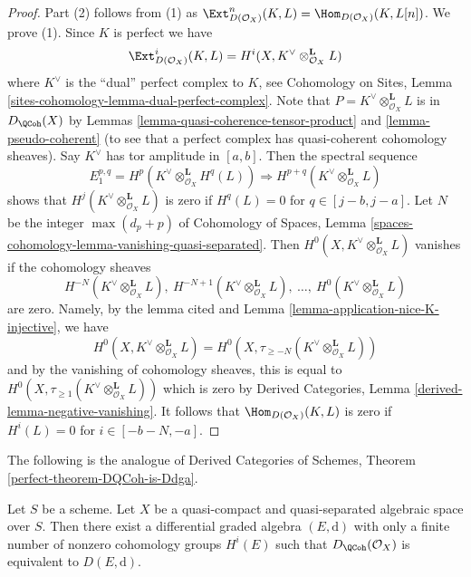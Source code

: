 \begin{proof}
Part (2) follows from (1) as $\Ext^n_{D(\mathcal{O}_X)}(K, L) =
\Hom_{D(\mathcal{O}_X)}(K, L[n])$. We prove (1).
Since $K$ is perfect we have
$$
\Ext^i_{D(\mathcal{O}_X)}(K, L) =
H^i(X, K^\vee \otimes_{\mathcal{O}_X}^\mathbf{L} L)
$$
where $K^\vee$ is the ``dual'' perfect complex to $K$, see
Cohomology on Sites, Lemma \ref{sites-cohomology-lemma-dual-perfect-complex}.
Note that $P = K^\vee \otimes_{\mathcal{O}_X}^\mathbf{L} L$
is in $D_\QCoh(X)$ by
Lemmas \ref{lemma-quasi-coherence-tensor-product} and
\ref{lemma-pseudo-coherent} (to see that a perfect complex
has quasi-coherent cohomology sheaves). Say $K^\vee$ has
tor amplitude in $[a, b]$. Then the spectral sequence
$$
E_1^{p, q} = H^p(K^\vee \otimes_{\mathcal{O}_X}^\mathbf{L} H^q(L))
\Rightarrow
H^{p + q}(K^\vee \otimes_{\mathcal{O}_X}^\mathbf{L} L)
$$
shows that $H^j(K^\vee \otimes_{\mathcal{O}_X}^\mathbf{L} L)$
is zero if $H^q(L) = 0$ for $q \in [j - b, j - a]$.
Let $N$ be the integer $\max(d_p + p)$ of
Cohomology of Spaces, Lemma
\ref{spaces-cohomology-lemma-vanishing-quasi-separated}.
Then $H^0(X, K^\vee \otimes_{\mathcal{O}_X}^\mathbf{L} L)$
vanishes if the cohomology sheaves
$$
H^{-N}(K^\vee \otimes_{\mathcal{O}_X}^\mathbf{L} L),
\ H^{-N + 1}(K^\vee \otimes_{\mathcal{O}_X}^\mathbf{L} L),
\ \ldots,
\ H^0(K^\vee \otimes_{\mathcal{O}_X}^\mathbf{L} L)
$$
are zero. Namely, by the lemma cited and
Lemma \ref{lemma-application-nice-K-injective}, we have
$$
H^0(X, K^\vee \otimes_{\mathcal{O}_X}^\mathbf{L} L) =
H^0(X, \tau_{\geq -N}(K^\vee \otimes_{\mathcal{O}_X}^\mathbf{L} L))
$$
and by the vanishing of cohomology sheaves, this is equal to
$H^0(X, \tau_{\geq 1}(K^\vee \otimes_{\mathcal{O}_X}^\mathbf{L} L))$
which is zero by Derived Categories, Lemma
\ref{derived-lemma-negative-vanishing}.
It follows that $\Hom_{D(\mathcal{O}_X)}(K, L)$ is zero if
$H^i(L) = 0$ for $i \in [-b - N, -a]$.
\end{proof}

\noindent
The following is the analogue of
Derived Categories of Schemes, Theorem \ref{perfect-theorem-DQCoh-is-Ddga}.

\begin{theorem}
\label{theorem-DQCoh-is-Ddga}
Let $S$ be a scheme.
Let $X$ be a quasi-compact and quasi-separated algebraic space over $S$.
Then there exist a differential graded algebra $(E, \text{d})$
with only a finite number of nonzero cohomology groups $H^i(E)$
such that $D_\QCoh(\mathcal{O}_X)$ is equivalent
to $D(E, \text{d})$.
\end{theorem}


